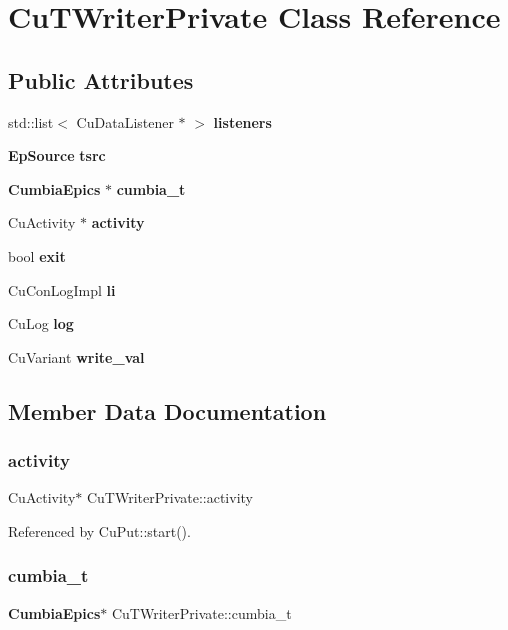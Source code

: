 \section{Cu\+T\+Writer\+Private Class Reference}
\label{classCuTWriterPrivate}
\subsection*{Public Attributes}
\begin{DoxyCompactItemize}
\item 
std\+::list$<$ Cu\+Data\+Listener $\ast$ $>$ \textbf{ listeners}
\item 
\textbf{ Ep\+Source} \textbf{ tsrc}
\item 
\textbf{ Cumbia\+Epics} $\ast$ \textbf{ cumbia\+\_\+t}
\item 
Cu\+Activity $\ast$ \textbf{ activity}
\item 
bool \textbf{ exit}
\item 
Cu\+Con\+Log\+Impl \textbf{ li}
\item 
Cu\+Log \textbf{ log}
\item 
Cu\+Variant \textbf{ write\+\_\+val}
\end{DoxyCompactItemize}


\subsection{Member Data Documentation}
\mbox{\label{classCuTWriterPrivate_ac57f24277fdcd4e07fcbf93472ccf812}} 
\subsubsection{activity}
{\footnotesize\ttfamily Cu\+Activity$\ast$ Cu\+T\+Writer\+Private\+::activity}



Referenced by Cu\+Put\+::start().

\mbox{\label{classCuTWriterPrivate_a3fd8a2b6009a7cb757bce98445c83e00}} 
\subsubsection{cumbia\+\_\+t}
{\footnotesize\ttfamily \textbf{ Cumbia\+Epics}$\ast$ Cu\+T\+Writer\+Private\+::cumbia\+\_\+t}



